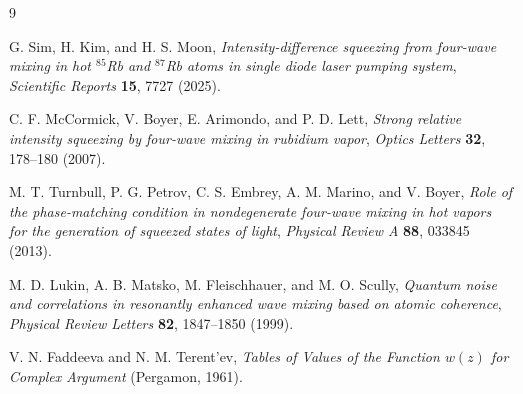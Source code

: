 \documentclass[11pt,a4paper]{article}
\begin{document}
\begin{thebibliography}{9}

G. Sim, H. Kim, and H. S. Moon,
\emph{Intensity-difference squeezing from four-wave mixing in hot
$^{85}$Rb and $^{87}$Rb atoms in single diode laser pumping system},
\emph{Scientific Reports} \textbf{15}, 7727 (2025).

C. F. McCormick, V. Boyer, E. Arimondo, and P. D. Lett,
\emph{Strong relative intensity squeezing by four-wave mixing in rubidium
vapor}, \emph{Optics Letters} \textbf{32}, 178--180 (2007).

M. T. Turnbull, P. G. Petrov, C. S. Embrey, A. M. Marino, and V. Boyer,
\emph{Role of the phase-matching condition in nondegenerate four-wave mixing
in hot vapors for the generation of squeezed states of light},
\emph{Physical Review A} \textbf{88}, 033845 (2013).

M. D. Lukin, A. B. Matsko, M. Fleischhauer, and M. O. Scully,
\emph{Quantum noise and correlations in resonantly enhanced wave mixing
based on atomic coherence}, \emph{Physical Review Letters} \textbf{82},
1847--1850 (1999).

V. N. Faddeeva and N. M. Terent'ev,
\emph{Tables of Values of the Function $w(z)$ for Complex Argument}
(Pergamon, 1961).

\end{thebibliography}
\end{document}
